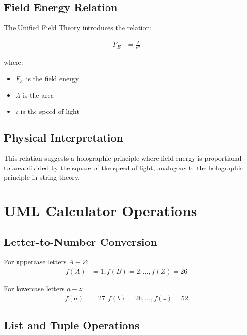\documentclass[12pt,a4paper]{article}
\begin{document}
\subsection{Field Energy Relation}

The Unified Field Theory introduces the relation:

\begin{align}
F_E &= \frac{A}{c^2}
\end{align}

where:
\begin{itemize}
\item $F_E$ is the field energy
\item $A$ is the area
\item $c$ is the speed of light
\end{itemize}

\subsection{Physical Interpretation}

This relation suggests a holographic principle where field energy is proportional to area divided by the square of the speed of light, analogous to the holographic principle in string theory.

\section{UML Calculator Operations}

\subsection{Letter-to-Number Conversion}

\begin{definition}
For uppercase letters $A-Z$:
\begin{align}
f(A) &= 1, f(B) = 2, \ldots, f(Z) = 26
\end{align}

For lowercase letters $a-z$:
\begin{align}
f(a) &= 27, f(b) = 28, \ldots, f(z) = 52
\end{align}
\end{definition}

\subsection{List and Tuple Operations}
\end{document}

